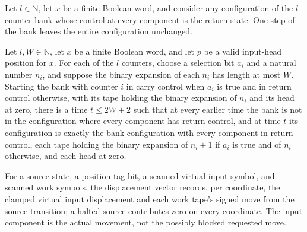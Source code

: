 \begin{lemma}
\label{Complexity.clBank_idle}
\leanok
{}
Let $l\in\mathbb{N}$, let $x$ be a finite Boolean word, and consider any configuration
of the $l$-counter bank whose control at every component is the return state. One step
of the bank leaves the entire configuration unchanged.
\end{lemma}

\begin{lemma}
\label{Complexity.clBank_first}
\leanok
{}
Let $l,W\in\mathbb{N}$, let $x$ be a finite Boolean word, and let $p$ be a valid
input-head position for $x$. For each of the $l$ counters, choose a selection bit $a_i$
and a natural number $n_i$, and suppose the binary expansion of each $n_i$ has length at
most $W$. Starting the bank with counter $i$ in carry control when $a_i$ is true and in
return control otherwise, with its tape holding the binary expansion of $n_i$ and its
head at zero, there is a time $t\le 2W+2$ such that at every earlier time the bank is
not in the configuration where every component has return control, and at time $t$ its
configuration is exactly the bank configuration with every component in return control,
each tape holding the binary expansion of $n_i+1$ if $a_i$ is true and of $n_i$
otherwise, and each head at zero.
\end{lemma}

\begin{definition}
\label{Complexity.clMoves}
\leanok
{}
For a source state, a position tag bit, a scanned virtual input symbol, and scanned work symbols, the displacement vector records, per coordinate, the clamped virtual input displacement and each work tape's signed move from the source transition; a halted source contributes zero on every coordinate. The input component is the actual movement, not the possibly blocked requested move.
\end{definition}

